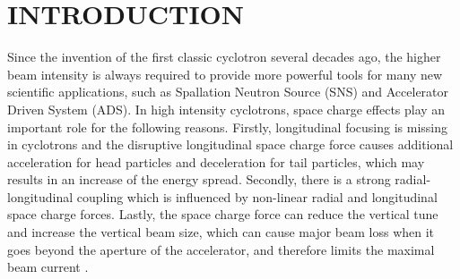 \documentclass[aps,prstab,twocolumn,superscriptaddress]{revtex4}
\begin{document}
\pacs{}

\maketitle

\section{INTRODUCTION \label{intro}}
Since the invention of the first classic cyclotron several decades ago, the higher beam intensity is always required  
to provide more powerful tools for many new scientific applications, such as Spallation Neutron Source (SNS)
and Accelerator Driven System (ADS).
In high intensity cyclotrons, space charge effects play an important role for the following reasons.
Firstly, longitudinal focusing is missing in cyclotrons and the disruptive longitudinal space charge force causes additional acceleration for 
head particles and deceleration for tail particles, which may results in an increase of the energy spread. Secondly, there is a strong 
radial-longitudinal coupling which is influenced by non-linear radial and longitudinal space charge forces. 
Lastly, the space charge force can reduce the vertical tune and increase the vertical beam size, which can cause major beam loss when 
it goes beyond the aperture of the accelerator, and therefore limits the maximal beam current \cite{Baartman:1}.
\end{document}
